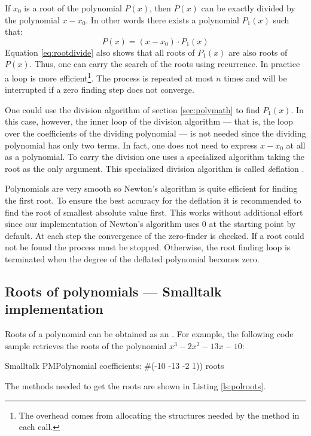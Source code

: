 If $x_0$ is a root of the polynomial $P\left(x\right)$, then
$P\left(x\right)$ can be exactly divided by the polynomial
$x-x_0$. In other words there exists a polynomial
$P_1\left(x\right)$ such that:
\begin{equation}
\label{eq:rootdivide}
  P\left(x\right) = \left(x-x_0\right)\cdot P_1\left(x\right)
\end{equation}
Equation \ref{eq:rootdivide} also shows that all roots of
$P_1\left(x\right)$ are also roots of $P\left(x\right)$. Thus, one
can carry the search of the roots using recurrence. In practice a
loop is more efficient\footnote{The overhead comes from allocating
the structures needed by the method in each call.}. The process is
repeated at most $n$ times and will be interrupted if a zero
finding step does not converge.

One could use the division algorithm of section \ref{sec:polymath}
to find $P_1\left(x\right)$. In this case, however, the inner loop
of the division algorithm --- that is, the loop over the
coefficients of the dividing polynomial --- is not needed since
the dividing polynomial has only two terms. In fact, one does not
need to express $x-x_0$ at all as a polynomial. To carry the
division one uses a specialized algorithm taking the root as the
only argument. This specialized division algorithm is called {\textsl
deflation} \cite{Press}.

Polynomials are very smooth so Newton's algorithm is quite
efficient for finding the first root. To ensure the best accuracy
for the deflation it is recommended to find the root of smallest
absolute value first. This works without additional effort since
our implementation of Newton's algorithm uses 0 at the starting
point by default. At each step the convergence of the zero-finder
is checked. If a root could not be found the process must be
stopped. Otherwise, the root finding loop is terminated when the
degree of the deflated polynomial becomes zero.

\subsection{Roots of polynomials --- Smalltalk implementation}
Roots of a polynomial can be obtained as an . For example, the following code sample retrieves the roots of the polynomial $x^3-2x^2-13x-10$:
\begin{displaycode}{Smalltalk}
PMPolynomial coefficients: \#(-10 -13 -2 1)) roots
\end{displaycode}
The methods needed to get the roots are shown in Listing
\ref{ls:polroots}.

